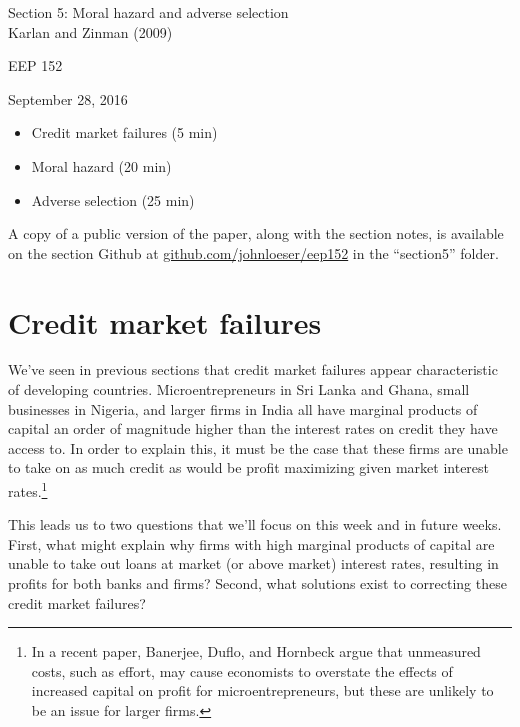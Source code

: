 \documentclass[12pt,english]{article}
\begin{document}
\begin{center}
{\Large{}Section 5: Moral hazard and adverse selection} \\
{\large{}Karlan and Zinman (2009)}
\par\end{center}{\Large \par}

\begin{center}
EEP 152
\par\end{center}

\begin{center}
September 28, 2016
\par\end{center}

\begin{itemize}
	\setlength\itemsep{-0.5em}
	\item Credit market failures (5 min)
	\item Moral hazard (20 min)
	\item Adverse selection (25 min)
\end{itemize}
A copy of a public version of the paper, along with the section notes, is available on the section Github at \href{github.com/johnloeser/eep152}{github.com/johnloeser/eep152} in the ``section5'' folder.

\section{Credit market failures}

We've seen in previous sections that credit market failures appear characteristic of developing countries. Microentrepreneurs in Sri Lanka and Ghana, small businesses in Nigeria, and larger firms in India all have marginal products of capital an order of magnitude higher than the interest rates on credit they have access to. In order to explain this, it must be the case that these firms are unable to take on as much credit as would be profit maximizing given market interest rates.\footnote{In a recent paper, Banerjee, Duflo, and Hornbeck argue that unmeasured costs, such as effort, may cause economists to overstate the effects of increased capital on profit for microentrepreneurs, but these are unlikely to be an issue for larger firms.}

This leads us to two questions that we'll focus on this week and in future weeks. First, what might explain why firms with high marginal products of capital are unable to take out loans at market (or above market) interest rates, resulting in profits for both banks and firms? Second, what solutions exist to correcting these credit market failures?
\end{document}

